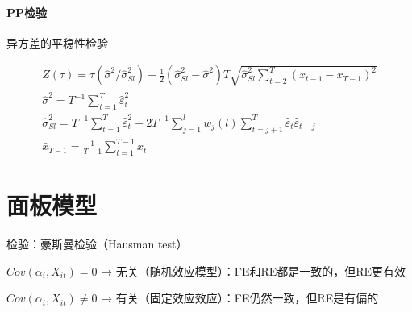 \documentclass[12pt]{book}
\begin{document}
\paragraph{PP检验}

异方差的平稳性检验

\begin{gather*}
    Z\left(\tau\right) =\tau(\hat{\sigma}^2/\hat{\sigma}_{Sl}^2 ) -\frac{1}{2}  (\hat{\sigma}_{Sl}^2-\hat{\sigma}^2) T \sqrt{\hat{\sigma}_{Sl}^2 \sum_{t=2}^{T}{(x_{t-1}-x_{T-1})^2}} \\
    {\hat{\sigma}}^2=T^{-1}\sum_{t=1}^{T}{\hat{\varepsilon}}_t^2\\
    {\hat{\sigma}}_{Sl}^2=T^{-1}\sum_{t=1}^{T}{\hat{\varepsilon}}_t^2+2T^{-1}\sum_{j=1}^{l}{w_j(l)\sum_{t=j+1}^{T}{{\hat{\varepsilon}}_t{\hat{\varepsilon}}_{t-j}}}\\
    \bar{x}_{T-1}=\frac{1}{T-1}\sum_{t=1}^{T-1}{x_t}
\end{gather*}












\section{面板模型}



\par 检验：豪斯曼检验（Hausman test）
\par $Cov(\alpha_i,X_{it})=0$ → 无关（随机效应模型）：FE和RE都是一致的，但RE更有效
\par $Cov(\alpha_i,X_{it})\neq 0 $ → 有关（固定效应效应）：FE仍然一致，但RE是有偏的
\end{document}
